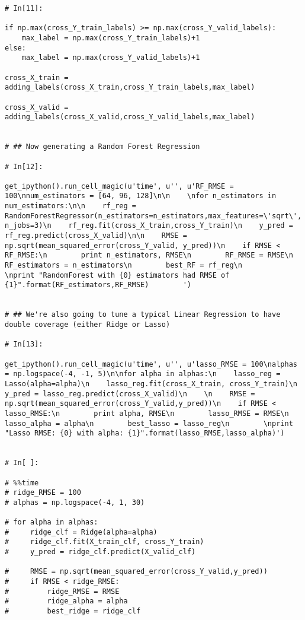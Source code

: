 \documentclass[11pt, oneside]{article}   	%
\begin{document}
\begin{lstlisting}
# In[11]:

if np.max(cross_Y_train_labels) >= np.max(cross_Y_valid_labels):
    max_label = np.max(cross_Y_train_labels)+1
else:
    max_label = np.max(cross_Y_valid_labels)+1

cross_X_train = adding_labels(cross_X_train,cross_Y_train_labels,max_label)

cross_X_valid = adding_labels(cross_X_valid,cross_Y_valid_labels,max_label)


# ## Now generating a Random Forest Regression

# In[12]:

get_ipython().run_cell_magic(u'time', u'', u'RF_RMSE = 100\nnum_estimators = [64, 96, 128]\n\n    \nfor n_estimators in num_estimators:\n\n    rf_reg = RandomForestRegressor(n_estimators=n_estimators,max_features=\'sqrt\', n_jobs=3)\n    rf_reg.fit(cross_X_train,cross_Y_train)\n    y_pred = rf_reg.predict(cross_X_valid)\n\n    RMSE = np.sqrt(mean_squared_error(cross_Y_valid, y_pred))\n    if RMSE < RF_RMSE:\n        print n_estimators, RMSE\n        RF_RMSE = RMSE\n        RF_estimators = n_estimators\n        best_RF = rf_reg\n            \nprint "RandomForest with {0} estimators had RMSE of {1}".format(RF_estimators,RF_RMSE)        ')


# ## We're also going to tune a typical Linear Regression to have double coverage (either Ridge or Lasso)

# In[13]:

get_ipython().run_cell_magic(u'time', u'', u'lasso_RMSE = 100\nalphas = np.logspace(-4, -1, 5)\n\nfor alpha in alphas:\n    lasso_reg = Lasso(alpha=alpha)\n    lasso_reg.fit(cross_X_train, cross_Y_train)\n    y_pred = lasso_reg.predict(cross_X_valid)\n    \n    RMSE = np.sqrt(mean_squared_error(cross_Y_valid,y_pred))\n    if RMSE < lasso_RMSE:\n        print alpha, RMSE\n        lasso_RMSE = RMSE\n        lasso_alpha = alpha\n        best_lasso = lasso_reg\n        \nprint "Lasso RMSE: {0} with alpha: {1}".format(lasso_RMSE,lasso_alpha)')


# In[ ]:

# %%time
# ridge_RMSE = 100
# alphas = np.logspace(-4, 1, 30)

# for alpha in alphas:
#     ridge_clf = Ridge(alpha=alpha)
#     ridge_clf.fit(X_train_clf, cross_Y_train)
#     y_pred = ridge_clf.predict(X_valid_clf)
    
#     RMSE = np.sqrt(mean_squared_error(cross_Y_valid,y_pred))
#     if RMSE < ridge_RMSE:
#         ridge_RMSE = RMSE
#         ridge_alpha = alpha
#         best_ridge = ridge_clf
        

\end{lstlisting}
\end{document}
